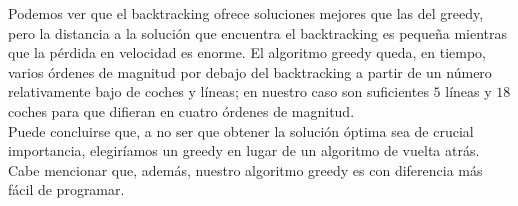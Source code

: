 Podemos ver que el backtracking ofrece soluciones mejores que las del greedy, pero la distancia a la solución que encuentra el backtracking es pequeña mientras que la pérdida en velocidad es enorme. El algoritmo greedy queda, en tiempo, varios órdenes de magnitud por debajo del backtracking a partir de un número relativamente bajo de coches y líneas; en nuestro caso son suficientes $5$ líneas y $18$ coches para que difieran en cuatro órdenes de magnitud. \\

Puede concluirse que, a no ser que obtener la solución óptima sea de crucial importancia, elegiríamos un greedy en lugar de un algoritmo de vuelta atrás. Cabe mencionar que, además, nuestro algoritmo greedy es con diferencia más fácil de programar.
